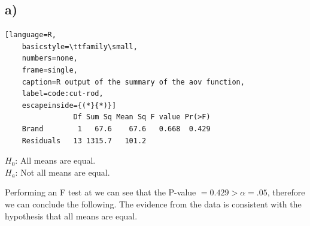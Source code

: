 \documentclass{article}
\begin{document}
\subsection*{a)}
\begin{lstlisting}[language=R, 
    basicstyle=\ttfamily\small,
    numbers=none, 
    frame=single, 
    caption=R output of the summary of the aov function,
    label=code:cut-rod,
    escapeinside={(*}{*)}]
                Df Sum Sq Mean Sq F value Pr(>F)
    Brand        1   67.6    67.6   0.668  0.429
    Residuals   13 1315.7   101.2 
\end{lstlisting}
\begin{flushleft}
$H_0$: All means are equal. \\
$H_a$: Not all means are equal. \\
\end{flushleft}
Performing an F test at we can see that the P-value $ = 0.429 > \alpha = .05$, therefore we can conclude the following.
The evidence from the data is consistent with the hypothesis that all means are equal.
\end{document}
